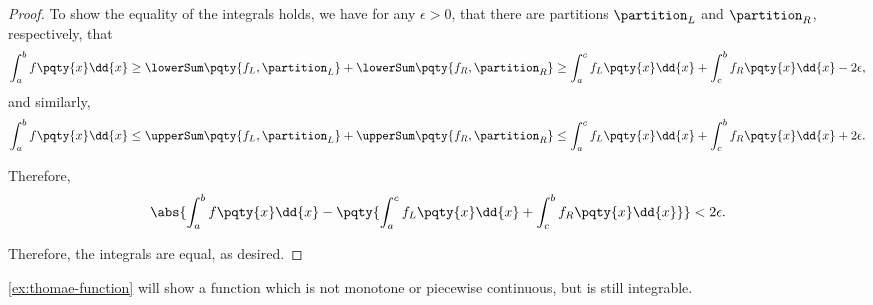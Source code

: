 \begin{proof}
    To show the equality of the integrals holds, we have for any \(\epsilon > 0\), that there are partitions \(\partition_L\) and \(\partition_R\), respectively, that
    \[
        \int_{a}^{b} f\pqty{x} \dd{x} \geq \lowerSum\pqty{f_L, \partition_L} + \lowerSum\pqty{f_R, \partition_R} \geq \int_{a}^{c} f_L\pqty{x} \dd{x} + \int_{c}^{b} f_R\pqty{x} \dd{x} - 2\epsilon,
    \]
    and similarly,
    \[
        \int_{a}^{b} f\pqty{x} \dd{x} \leq \upperSum\pqty{f_L, \partition_L} + \upperSum\pqty{f_R, \partition_R} \leq \int_{a}^{c} f_L\pqty{x} \dd{x} + \int_{c}^{b} f_R\pqty{x} \dd{x} + 2\epsilon.
    \]

    Therefore,
    \[
        \abs{\int_{a}^{b} f\pqty{x} \dd{x} - \pqty{\int_{a}^{c} f_L\pqty{x} \dd{x} + \int_{c}^{b} f_R\pqty{x} \dd{x}}} < 2 \epsilon.
    \]

    Therefore, the integrals are equal, as desired.
\end{proof}

\autoref{ex:thomae-function} will show a function which is not monotone or piecewise continuous, but is still integrable.

